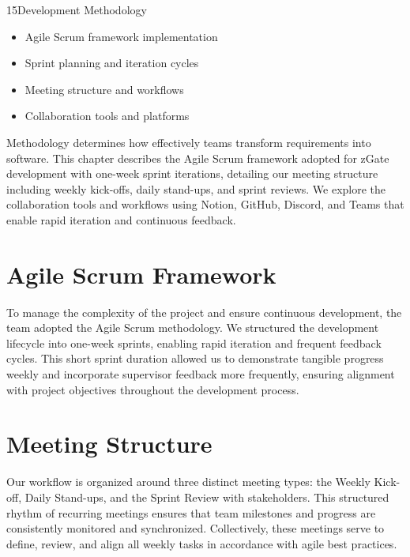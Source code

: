 
\begin{sectionintro}{15}{Development Methodology}{
  \begin{itemize}[leftmargin=1.5em]
    \item Agile Scrum framework implementation
    \item Sprint planning and iteration cycles
    \item Meeting structure and workflows
    \item Collaboration tools and platforms
  \end{itemize}
}
Methodology determines how effectively teams transform requirements into software. This chapter describes the Agile Scrum framework adopted for zGate development with one-week sprint iterations, detailing our meeting structure including weekly kick-offs, daily stand-ups, and sprint reviews. We explore the collaboration tools and workflows using Notion, GitHub, Discord, and Teams that enable rapid iteration and continuous feedback.
\end{sectionintro}

\section{Agile Scrum Framework}
To manage the complexity of the project and ensure continuous development, the team adopted the Agile Scrum methodology. We structured the development lifecycle into one-week sprints, enabling rapid iteration and frequent feedback cycles. This short sprint duration allowed us to demonstrate tangible progress weekly and incorporate supervisor feedback more frequently, ensuring alignment with project objectives throughout the development process.

\section{Meeting Structure}
Our workflow is organized around three distinct meeting types: the Weekly Kick-off, Daily Stand-ups, and the Sprint Review with stakeholders. This structured rhythm of recurring meetings ensures that team milestones and progress are consistently monitored and synchronized. Collectively, these meetings serve to define, review, and align all weekly tasks in accordance with agile best practices.

